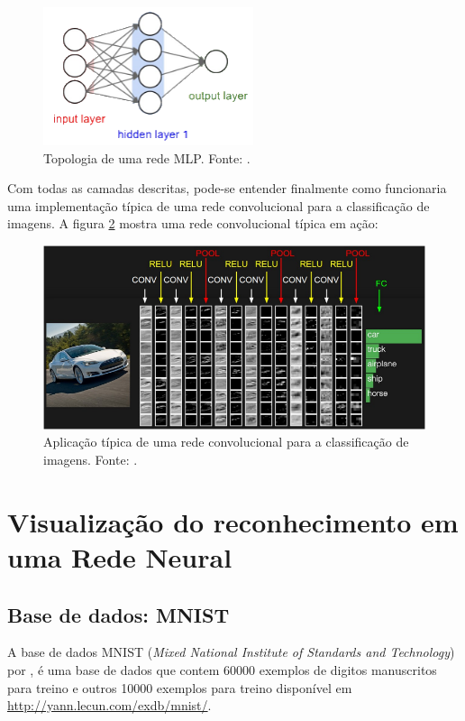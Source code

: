 \documentclass[
	12pt,				%
	oneside,			%
	a4paper,			%
	english,			%
	french,				%
	spanish,			%
	brazil,				%
	]{abntex2}
\begin{document}
\begin{figure}[H]
	\centering
	\includegraphics[width=.4\textwidth]{imagens/MLP1}
	\caption{Topologia de uma rede MLP. Fonte: \cite{ref3}.}
	\label{topologiaMLP}
\end{figure} 

Com todas as camadas descritas, pode-se entender finalmente como funcionaria uma implementação típica de uma rede convolucional para a classificação de imagens. A figura \ref{final} mostra uma rede convolucional típica em ação:

\begin{figure}[H]
	\centering
	\includegraphics[width=.8\textwidth]{imagens/final}
	\caption{Aplicação típica de uma rede convolucional para a classificação de imagens. Fonte: \cite{ref3}.}
	\label{final}
\end{figure} 



\chapter{Visualização do reconhecimento em uma Rede Neural}
\section{Base de dados: MNIST}

\par A base de dados MNIST (\textit{Mixed National Institute of Standards and Technology}) por , é uma base de dados que contem 60000 exemplos de digitos manuscritos para treino e outros 10000 exemplos para treino disponível em \url{http://yann.lecun.com/exdb/mnist/}.
\end{document}
